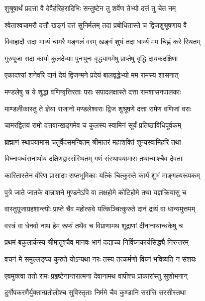 \twolineshloka
{शुश्रूषार्थं प्रदत्ता वै देवैर्हरिहरादिभिः}
{सन्तुष्टेन तु शर्वेण तेभ्यो दत्तं तु चेत नम्}%

\twolineshloka
{श्वेताश्वचामरौ दत्तौ खङ्गं दत्तं सुनिर्मलम्}
{तदा प्रबोधितास्ते च द्विजशुश्रूषणाय वै}%

\twolineshloka
{विवाहादौ सदा भाव्यं चामरै मङ्गलं वरम्}
{खङ्गं शुभं तदा धार्य्यं मम चिह्नं करे स्थितम्}%

\twolineshloka
{गुरुपूजा सदा कार्या कुलदेव्याः पुनःपुनः}
{वृद्ध्यागमेषु प्राप्तेषु वृद्धि दायकदक्षिणा}%

\twolineshloka
{एकादश्यां शनेर्वारे दानं देयं द्विजन्मने}
{प्रदेयं बालवृद्धेभ्यो मम रामस्य शासनात्}%

\twolineshloka
{मण्डलेषु च ये शुद्धा वणिग्वृत्तिरताः पराः}
{सपादलक्षास्ते दत्ता रामशासनपालकाः}%

\twolineshloka
{माण्डलीकास्तु ते ज्ञेया राजानो मण्डलेश्वराः}
{द्विज शुश्रूषणे दत्ता रामेण वणिजां वराः}%

\twolineshloka
{चामरद्वितयं रामो दत्तवान्खड्गमेव च}
{कुलस्य स्वामिनं सूर्यं प्रतिष्ठाविधिपूर्वकम्}%

\twolineshloka
{ब्रह्माणं स्थापयामास चतुर्वेदसमन्वितम्}
{श्रीमातरं महाशक्तिं शून्यस्वामिहरिं तथा}%

\twolineshloka
{विघ्नापध्वंसनार्थाय दक्षिणद्वारसंस्थितम्}
{गणं संस्थापयामास तथान्याश्चैव देवताः}%

\twolineshloka
{कारितास्तेन वीरेण प्रासादाः सप्तभूमिकाः}
{यत्किं चित्कुरुते कार्यं शुभं माङ्गल्यरूपकम्}%

\twolineshloka
{पुत्रे जाते जातके वान्नाशने मुण्डनेऽपि वा}
{लक्षहोमे कोटिहोमे तथा यज्ञक्रियासु च}%

\twolineshloka
{वास्तुपूजाग्रहशान्त्योः प्राप्ते चैव महोत्सवे}
{यत्किञ्चित्कुरुते दानं द्रव्यं वा धान्यमुत्तमम्}%

\twolineshloka
{वस्त्रं वा धेनवो नाथ हेम रूप्यं तथैव च}
{विप्राणामथ शूद्राणां दीनानाथान्धकेषु च}%

\twolineshloka
{प्रथमं बकुलार्कस्य श्रीमातुश्चैव मानवः}
{भागं दद्याच्च निर्विघ्नकार्यसिद्ध्यै निरन्तरम्}%

\twolineshloka
{वचनं मे समुल्लङ्घ्य कुरुते योऽन्यथा नरः}
{तस्य तत्कर्मणो विघ्नं भविष्यति न संशयः}%

\twolineshloka
{एवमुक्त्वा ततो रामः प्रहृष्टेनान्तरात्मना}
{देवानामथ वापीश्च प्राकारांस्तु सुशोभनान्}%

\twolineshloka
{दुर्गोपकरणैर्युक्तान्प्रतोलीश्च सुविस्तृताः}
{निर्ममे चैव कुण्डानि सरांसि सरसीस्तथा}%


